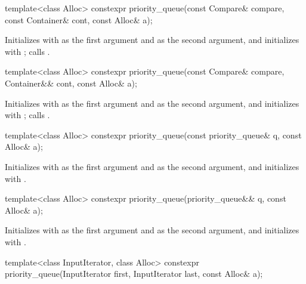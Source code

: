 %
\begin{itemdecl}
template<class Alloc>
  constexpr priority_queue(const Compare& compare, const Container& cont, const Alloc& a);
\end{itemdecl}

\begin{itemdescr}
\pnum
\effects
Initializes  with  as the first argument and  as the second
argument, and initializes  with ;
calls .
\end{itemdescr}

%
\begin{itemdecl}
template<class Alloc>
  constexpr priority_queue(const Compare& compare, Container&& cont, const Alloc& a);
\end{itemdecl}

\begin{itemdescr}
\pnum
\effects
Initializes  with  as the first argument and 
as the second argument, and initializes  with ;
calls .
\end{itemdescr}

%
\begin{itemdecl}
template<class Alloc> constexpr priority_queue(const priority_queue& q, const Alloc& a);
\end{itemdecl}

\begin{itemdescr}
\pnum
\effects
Initializes  with  as the first argument and  as
the second argument, and initializes  with .
\end{itemdescr}

%
\begin{itemdecl}
template<class Alloc> constexpr priority_queue(priority_queue&& q, const Alloc& a);
\end{itemdecl}

\begin{itemdescr}
\pnum
\effects
Initializes  with  as the first argument and 
as the second argument, and initializes  with .
\end{itemdescr}

%
\begin{itemdecl}
template<class InputIterator, class Alloc>
  constexpr priority_queue(InputIterator first, InputIterator last, const Alloc& a);
\end{itemdecl}

